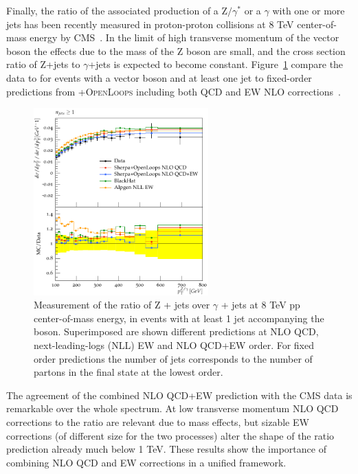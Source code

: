 \documentclass{PoS}
\providecommand{\OPENLOOPS} {{\textsc{OpenLoops}}\xspace}
\begin{document}
Finally, the ratio of the associated production of a $\mathrm{Z}/\gamma^*$ or a $\gamma$ with one or more jets has been recently measured in
proton-proton collisions at 8 TeV center-of-mass energy by CMS~\cite{Khachatryan:2015ira}.
In the limit of high transverse momentum of the vector boson the effects due to the mass of the Z
boson are small, and the cross section ratio of Z+jets to $\gamma$+jets is expected to become constant. 
Figure~\ref{zgrNLO} compare the data to for events with a vector boson and at least one
jet to fixed-order predictions from \SHERPA+\OPENLOOPS including both QCD and EW NLO corrections~\cite{Kallweit:2014xda,Kallweit:2015dum}. 
\begin{figure}
\begin{center}
\includegraphics[width=0.6\textwidth]{Figure14.pdf} 
 \caption{Measurement of the ratio of Z + jets over $\gamma$ + jets at 8 TeV pp
   center-of-mass energy, in events with at least 1 jet accompanying the
   boson. Superimposed are shown different predictions at NLO QCD, next-leading-logs (NLL) EW and NLO QCD+EW order. 
   For fixed order predictions the number of jets corresponds to the
   number of partons in the final state at the lowest order.} 
\label{zgrNLO}
\end{center}
\end{figure}
The agreement of the combined NLO QCD+EW prediction with the CMS data is
remarkable over the whole spectrum. At low transverse momentum
NLO QCD corrections to the ratio are relevant due to mass effects, but sizable
EW corrections (of different size for the two processes) alter the shape of the ratio prediction already much below 1
TeV. These results show the importance of combining NLO QCD and EW corrections in a unified framework.
\end{document}
